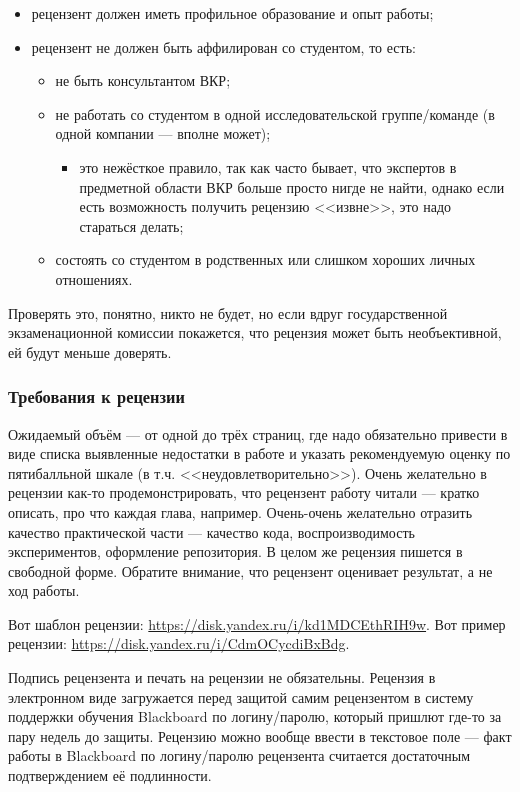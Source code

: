 \documentclass{article}
\begin{document}
\begin{itemize}
    \item рецензент должен иметь профильное образование и опыт работы;
    \item рецензент не должен быть аффилирован со студентом, то есть:
    \begin{itemize}
        \item не быть консультантом ВКР;
        \item не работать со студентом в одной исследовательской группе/команде (в одной компании --- вполне может);
        \begin{itemize}
            \item это нежёсткое правило, так как часто бывает, что экспертов в предметной области ВКР больше просто нигде не найти, однако если есть возможность получить рецензию <<извне>>, это надо стараться делать;
        \end{itemize}
        \item состоять со студентом в родственных или слишком хороших личных отношениях.
    \end{itemize}
\end{itemize}

Проверять это, понятно, никто не будет, но если вдруг государственной экзаменационной комиссии покажется, что рецензия может быть необъективной, ей будут меньше доверять.

\subsubsection{Требования к рецензии}

Ожидаемый объём --- от одной до трёх страниц, где надо обязательно привести в виде списка выявленные недостатки в работе и указать рекомендуемую оценку по пятибалльной шкале (в т.ч. <<неудовлетворительно>>). Очень желательно в рецензии как-то продемонстрировать, что рецензент работу читали --- кратко описать, про что каждая глава, например. Очень-очень желательно отразить качество практической части --- качество кода, воспроизводимость экспериментов, оформление репозитория. В целом же рецензия пишется в свободной форме. Обратите внимание, что рецензент оценивает результат, а не ход работы.

Вот шаблон рецензии: \url{https://disk.yandex.ru/i/kd1MDCEthRIH9w}. Вот пример рецензии: \url{https://disk.yandex.ru/i/CdmOCycdiBxBdg}.

Подпись рецензента и печать на рецензии не обязательны. Рецензия в электронном виде загружается перед защитой самим рецензентом в систему поддержки обучения Blackboard по логину/паролю, который пришлют где-то за пару недель до защиты. Рецензию можно вообще ввести в текстовое поле --- факт работы в Blackboard по логину/паролю рецензента считается достаточным подтверждением её подлинности. 
\end{document}
